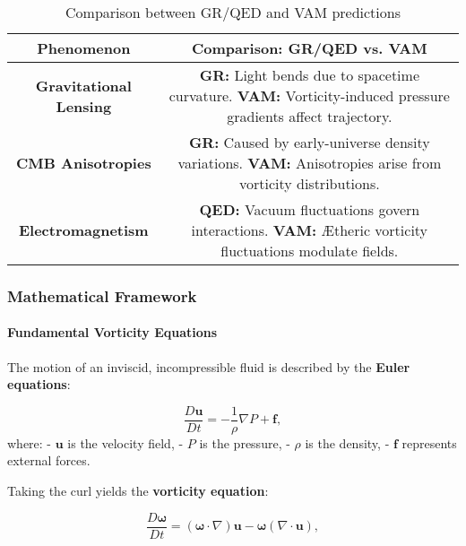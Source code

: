 \begin{table}[h]
    \centering
    \renewcommand{\arraystretch}{1.3}
    \begin{tabular}{|c|c|}
        \hline
        \textbf{Phenomenon} & \textbf{Comparison: GR/QED vs. VAM} \\
        \hline
        \textbf{Gravitational Lensing} &
        \textbf{GR:} Light bends due to spacetime curvature. \newline
        \textbf{VAM:} Vorticity-induced pressure gradients affect trajectory. \\
        \hline
        \textbf{CMB Anisotropies} &
        \textbf{GR:} Caused by early-universe density variations. \newline
        \textbf{VAM:} Anisotropies arise from vorticity distributions. \\
        \hline
        \textbf{Electromagnetism} &
        \textbf{QED:} Vacuum fluctuations govern interactions. \newline
        \textbf{VAM:} Ætheric vorticity fluctuations modulate fields. \\
        \hline
    \end{tabular}

    \caption{Comparison between GR/QED and VAM predictions}
    \label{tab:comparison}
\end{table}


    \subsubsection*{Mathematical Framework}

    \paragraph*{Fundamental Vorticity Equations}
    The motion of an inviscid, incompressible fluid is described by the \textbf{Euler equations}:

    \begin{equation*}
        \frac{D\boldsymbol{u}}{Dt} = -\frac{1}{\rho} \nabla P + \boldsymbol{f},
    \end{equation*}
    where:
    - \( \boldsymbol{u} \) is the velocity field,
    - \( P \) is the pressure,
    - \( \rho \) is the density,
    - \( \boldsymbol{f} \) represents external forces.

    Taking the curl yields the \textbf{vorticity equation}:

    \begin{equation*}
        \frac{D\boldsymbol{\omega}}{Dt} = (\boldsymbol{\omega} \cdot \nabla) \boldsymbol{u} - \boldsymbol{\omega} (\nabla \cdot \boldsymbol{u}),
    \end{equation*}

